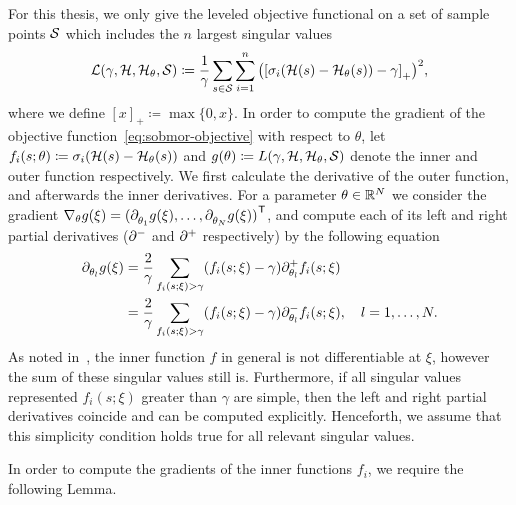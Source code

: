 For this thesis, we only give the leveled objective functional on a set of sample points $\mcl{S}$ which includes the $n$ largest singular values
\begin{equation}\label{eq:sobmor-objective}
    \mcl{L}(\gamma, \mcl{H}, \mcl{H}_\theta, \mcl{S}) \coloneqq \frac{1}{\gamma} \sum\limits_{s \in \mcl{S}} \sum\limits_{i = 1}^n {\left( {[\sigma_i(\mcl{H}(s) - \mcl{H}_\theta(s)) - \gamma]}_+ \right)}^2,
\end{equation}
where we define ${[x]}_+ \coloneqq \max \{ 0, x \}$.
In order to compute the gradient of the objective function~\eqref{eq:sobmor-objective} with respect to $\theta$, let $f_i(s; \theta) \coloneqq \sigma_i(\mcl{H}(s) - \mcl{H}_\theta(s))$ and $g(\theta) \coloneqq L(\gamma, \mcl{H}, \mcl{H}_\theta, \mcl{S})$ denote the inner and outer function respectively.
We first calculate the derivative of the outer function, and afterwards the inner derivatives.
For a parameter $\theta \in \bb{R}^N$ we consider the gradient $\nabla_\theta g(\xi) = {(\pd[\theta_1]{} g(\xi), \dots, \pd[\theta_N]{} g(\xi))}\trans$, and compute each of its left and right partial derivatives ($\pd[]{-}$ and $\pd[]{+}$ respectively) by the following equation
\begin{equation}\label{eq:outer-sobmor-objective-gradient}
    \begin{alignedat}{1}
        \pd[\theta_l]{} g(\xi) &= \frac{2}{\gamma} \sum\limits_{f_i(s; \xi) > \gamma} (f_i(s; \xi) - \gamma) \pd[\theta_l]{+} f_i(s; \xi) \\
        &= \frac{2}{\gamma} \sum\limits_{f_i(s; \xi) > \gamma} (f_i(s; \xi) - \gamma) \pd[\theta_l]{-} f_i(s; \xi),\quad l = 1, \dots, N.
    \end{alignedat}
\end{equation}
As noted in~\cite[Remark~3.8]{Schwerdtner2023}, the inner function $f$ in general is not differentiable at $\xi$, however the sum of these singular values still is.
Furthermore, if all singular values represented $f_i(s; \xi)$ greater than $\gamma$ are simple, then the left and right partial derivatives coincide and can be computed explicitly.
Henceforth, we assume that this simplicity condition holds true for all relevant singular values.


In order to compute the gradients of the inner functions $f_i$, we require the following Lemma.

